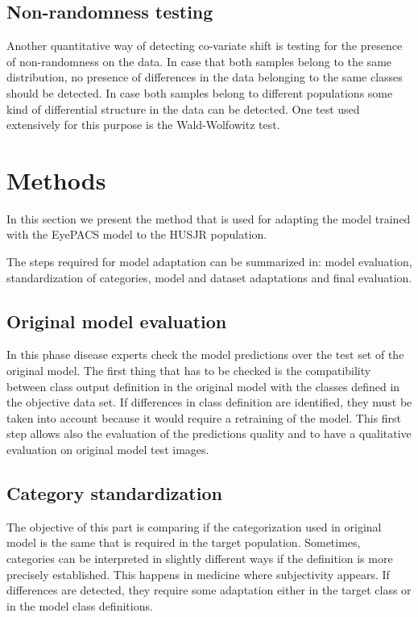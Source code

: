 \subsection{Non-randomness testing}

Another quantitative way of detecting co-variate shift is testing for the presence of non-randomness on the data. In case that both samples belong to the same distribution, no presence of differences in the data belonging to the same classes should be detected. In case both samples belong to different populations some kind of differential structure in the data can be detected. One test used extensively for this purpose is the Wald-Wolfowitz test.

\fi %

\section{Methods}

In this section we present the method that is used for adapting the model trained with the EyePACS model to the HUSJR population. 

The steps required for model adaptation can be summarized in: model evaluation, standardization of categories, model and dataset adaptations and final evaluation.

\subsection{Original model evaluation}

In this phase disease experts check the model predictions over the test set of the original model. The first thing that has to be checked is the compatibility between class output definition in the original model with the classes defined in the objective data set. If differences in class definition are identified, they must be taken into account because it would require a retraining of the model. This first step allows also the evaluation of the predictions quality and to have a qualitative evaluation on original model test images.

\subsection{Category standardization}

The objective of this part is comparing if the categorization used in original model is the same that is required in the target population. Sometimes, categories can be interpreted in slightly different ways if the definition is more precisely established. This happens in medicine where subjectivity appears. If differences are detected, they require some adaptation either in the target class or in the model class definitions.

